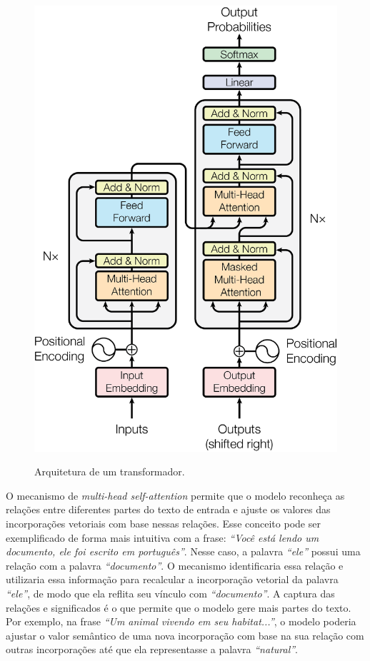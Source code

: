 \begin{figure}[ht]
      \centering
      \caption{\small Arquitetura de um transformador.}
      \includegraphics[width=0.4\columnwidth,keepaspectratio]{images/transformer.png}
      \label{fig:transformer}
\end{figure}

O mecanismo de \textit{multi-head self-attention} permite que o modelo reconheça as relações entre diferentes partes do texto de entrada e ajuste os valores das
incorporações vetoriais com base nessas relações. Esse conceito pode ser exemplificado de forma mais intuitiva com a frase: \textit{``Você está lendo um documento, ele
      foi escrito em português''}. Nesse caso, a palavra \textit{``ele''} possui uma relação com a palavra \textit{``documento''}. O mecanismo identificaria essa relação e
utilizaria essa informação para recalcular a incorporação vetorial da palavra \textit{``ele''}, de modo que ela reflita seu vínculo com \textit{``documento''}. A captura
das relações e significados é o que permite que o modelo gere mais partes do texto. Por exemplo, na frase \textit{``Um animal vivendo em seu habitat...''}, o modelo
poderia ajustar o valor semântico de uma nova incorporação com base na sua relação com outras incorporações até que ela representasse a palavra \textit{``natural''}.

